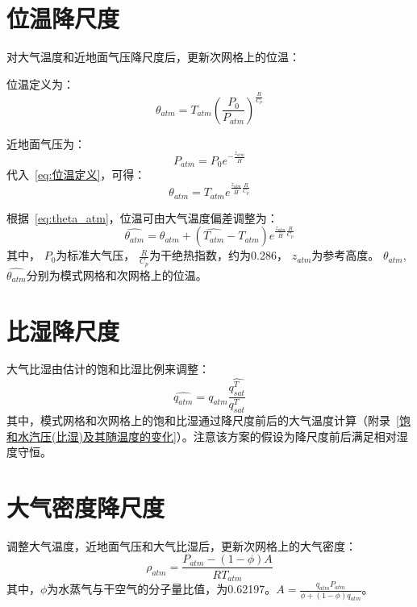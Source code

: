 \section{位温降尺度}
对大气温度和近地面气压降尺度后，更新次网格上的位温：

位温定义为：
\begin{equation}\label{eq:位温定义}
\theta_{atm}=T_{atm} \left(\frac{P_0}{P_{atm}}\right)^\frac{R}{C_{p}}
\end{equation}

近地面气压为：
\begin{equation}\label{eq:近地面气压}
{P_{atm}}=P_{0} e^{-\frac{z_{atm}}{\bar{H}}}
\end{equation}
%
代入~\eqref{eq:位温定义}，可得：
\begin{equation}\label{eq:theta_atm}
\theta_{atm}=T_{atm} e^{\frac{z_{atm}}{\bar{H}} \frac{R}{C_{p}}}
\end{equation}

根据~\eqref{eq:theta_atm}，位温可由大气温度偏差调整为：
\begin{equation}
\hat{\theta_{atm}}=\theta_{atm}+\left(\hat{T_{atm}}-T_{atm}\right) e^{\frac{z_{atm}}{\bar{H}} \frac{R}{C_{p}}}
\end{equation}
其中，
$P_{0}$为标准大气压，
$\frac{R}{C_{p}}$为干绝热指数，约为0.286，
$z_{atm}$为参考高度。
$\theta_{atm}$, $\hat{\theta_{atm}}$分别为模式网格和次网格上的位温。

\section{比湿降尺度}
大气比湿由估计的饱和比湿比例来调整：
\begin{equation}
\hat{q_{atm}}=q_{atm} \frac{\hat{q_{sat}^T}}{q_{sat}^T} 
\end{equation}
其中，模式网格和次网格上的饱和比湿通过降尺度前后的大气温度计算（附录~\ref{饱和水汽压(比湿)及其随温度的变化}）。注意该方案的假设为降尺度前后满足相对湿度守恒。

\section{大气密度降尺度}
调整大气温度，近地面气压和大气比湿后，更新次网格上的大气密度：
\begin{equation}
\rho_{atm}=\frac{P_{atm}-(1-\phi)A}{R T_{atm}}
\end{equation}
其中，$\phi$为水蒸气与干空气的分子量比值，为0.62197。$A=\frac{q_{atm} P_{atm}}{\phi +(1-\phi)q_{atm}}$。


